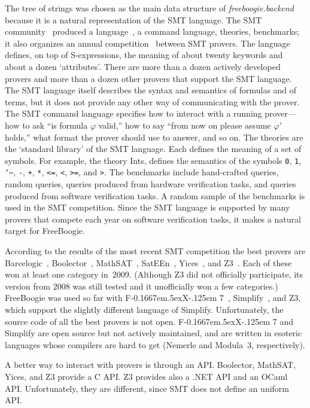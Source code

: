 \documentclass{llncs}
\newcommand{\fx}{F\kern-0.1667em\lower.5ex\hbox{X}\kern-.125em 7\xspace}
\begin{document}
The tree of strings was chosen as the main data
structure of \textit{freeboogie.backend} because it
is a natural representation of the SMT language. The
SMT community~\cite{ranise2009smtlib} produced a
language~\cite{ranise2006smtlang}, a command language,
theories, benchmarks; it also organizes an annual
competition~\cite{barrett2005} between SMT provers. The language
defines, on top of S-expressions, the meaning of about twenty
keywords and about a dozen `attributes'. There are more than a
dozen actively developed provers and more than a dozen other
provers that support the SMT language. The SMT language itself
describes the syntax and semantics of formulas and of terms,
but it does not provide any other way of communicating with the
prover. The SMT command language specifies how to interact with
a running prover---how to ask ``is formula $\varphi$ valid,''
how to say ``from now on please assume $\varphi'$ holds,''
what format the prover should use to answer, and so on. The
theories are the `standard library' of the SMT language. Each
defines the meaning of a set of symbols. For example, the
theory Ints, defines the semantics of the symbols \texttt{0},
\texttt{1}, \texttt{\char`\~}, \texttt{-}, \texttt{+},
\texttt{*}, \texttt{<=}, \texttt{<}, \texttt{>=}, and \texttt{>}.
The benchmarks include hand-crafted queries, random queries,
queries produced from hardware verification tasks, and queries
produced from software verification tasks. A random sample of the
benchmarks is used in the SMT competition. Since the SMT language
is supported by many provers that compete each year on software
verification tasks, it makes a natural target for FreeBoogie.

According to the results of the most recent SMT competition
the best provers are Barcelogic~\cite{bofill2008barcelogic},
Boolector~\cite{brummayer2009boolector},
MathSAT~\cite{bruttomesso2008mathsat}, SatEEn~\cite{sateen},
Yices~\cite{yices}, and Z3~\cite{moura2008z3}. Each of these won
at least one category in~2009. (Although Z3 did not officially
participate, its version from 2008 was still tested and it
unofficially won a few categories.) FreeBoogie was used so
far with \fx~\cite{fx7}, Simplify~\cite{detlefs2005}, and Z3,
which support the slightly different language of Simplify.
Unfortunately, the source code of all the best provers is
not open. \fx and Simplify are open source but not actively
maintained, and are written in esoteric languages whose compilers
are hard to get (Nemerle and Modula~3, respectively).

A better way to interact with provers is through an API\null.
Boolector, MathSAT, Yices, and Z3 provide a C API\null. Z3
provides also a .NET API and an OCaml API\null. Unfortunately,
they are different, since SMT does not define an uniform
API\null.
\end{document}

